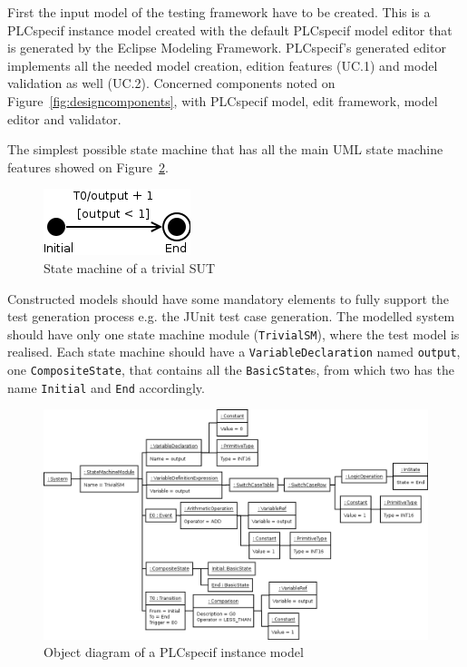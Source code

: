 First the input model of the testing framework have to be created. This is a PLCspecif instance model created with the default PLCspecif model editor that is generated by the Eclipse Modeling Framework. PLCspecif's generated editor implements all the needed model creation, edition features (UC.1) and model validation as well (UC.2). Concerned components noted on Figure~\ref{fig:designcomponents}, with PLCspecif model, edit framework, model editor and validator.
	
The simplest possible state machine that has all the main UML state machine features showed on Figure~\ref{fig:implementation_model}.
	
\begin{figure}[htp]
\centering
\includegraphics[scale=0.4]{figures/implementation_trivialsm}
\caption{State machine of a trivial SUT}
\label{fig:implementation_trivialsm}
\end{figure}

Constructed models should have some mandatory elements to fully support the test generation process e.g. the JUnit test case generation. The modelled system should have only one state machine module (\texttt{TrivialSM}), where the test model is realised. Each state machine should have a \texttt{VariableDeclaration} named \texttt{output}, one \texttt{CompositeState}, that contains all the \texttt{BasicState}s, from which two has the name \texttt{Initial} and \texttt{End} accordingly.
	
\begin{figure}[htp]
\centering
\includegraphics[scale=0.4]{figures/implementation_model}
\caption{Object diagram of a PLCspecif instance model}
\label{fig:implementation_model}
\end{figure}
	
